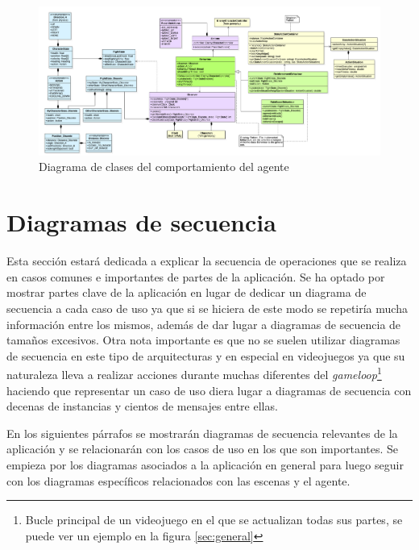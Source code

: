 \clearpage
\begin{landscape}
\begin{figure}
	\begin{adjustwidth}{-3cm}{}
		\includegraphics[width=24cm]{otros/UML/png/alld/png/gamelogic__gameplay__characterAI__diagramaDeClases_IA_5.png}
		\caption{Diagrama de clases del comportamiento del agente}
		\label{class:agent}
	\end{adjustwidth}
\end{figure}
\end{landscape}
\clearpage



\section{Diagramas de secuencia}

Esta sección estará dedicada a explicar la secuencia de operaciones que se realiza en casos comunes e importantes de partes de la aplicación. Se ha optado por mostrar partes clave de la aplicación en lugar de dedicar un diagrama de secuencia a cada caso de uso ya que si se hiciera de este modo se repetiría mucha información entre los mismos, además de dar lugar a diagramas de secuencia de tamaños excesivos. Otra nota importante es que no se suelen utilizar diagramas de secuencia en este tipo de arquitecturas y en especial en videojuegos ya que su naturaleza lleva a realizar acciones durante muchas diferentes del \textit{gameloop}\footnote{Bucle principal de un videojuego en el que se actualizan todas sus partes, se puede ver un ejemplo en la figura \ref{sec:general}} haciendo que representar un caso de uso diera lugar a diagramas de secuencia con decenas de instancias y cientos de mensajes entre ellas.

\bigskip

En los siguientes párrafos se mostrarán diagramas de secuencia relevantes de la aplicación y se relacionarán con los casos de uso en los que son importantes. Se empieza por los diagramas asociados a la aplicación en general para luego seguir con los diagramas específicos relacionados con las escenas y el agente.

